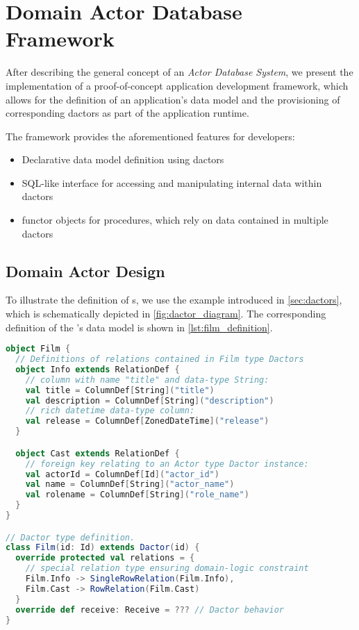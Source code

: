 
\section{Domain Actor Database Framework}\label{sec:framework}

After describing the general concept of an \textit{Actor Database System}, we present the implementation of a proof-of-concept application development framework, which allows for the definition of an application's data model and the provisioning of corresponding \glspl{dactor} as part of the application runtime.

The framework provides the aforementioned features for developers:
\begin{itemize}
  \item Declarative data model definition using \glspl{dactor}
  \item SQL-like interface for accessing and manipulating internal data within \glspl{dactor}
  \item \Gls{functor} objects for procedures, which rely on data contained in multiple \glspl{dactor}
\end{itemize}

\subsection{Domain Actor Design}\label{subsec:domain_actor_design}

To illustrate the definition of s, we use the example introduced in \cref{sec:dactors}, which is schematically depicted in \cref{fig:dactor_diagram}.
The corresponding definition of the 's data model is shown in \cref{lst:film_definition}.
\begin{lstlisting}[float, caption={Film Dactor type definition using the presented framework.}, label={lst:film_definition}, language=Scala]
object Film {
  // Definitions of relations contained in Film type Dactors
  object Info extends RelationDef {
    // column with name "title" and data-type String:
    val title = ColumnDef[String]("title")
    val description = ColumnDef[String]("description")
    // rich datetime data-type column:
    val release = ColumnDef[ZonedDateTime]("release")
  }

  object Cast extends RelationDef {
    // foreign key relating to an Actor type Dactor instance:
    val actorId = ColumnDef[Id]("actor_id")
    val name = ColumnDef[String]("actor_name")
    val rolename = ColumnDef[String]("role_name")
  }
} 

// Dactor type definition.
class Film(id: Id) extends Dactor(id) {
  override protected val relations = {
    // special relation type ensuring domain-logic constraint
    Film.Info -> SingleRowRelation(Film.Info),
    Film.Cast -> RowRelation(Film.Cast)
  }
  override def receive: Receive = ??? // Dactor behavior
}
\end{lstlisting}

